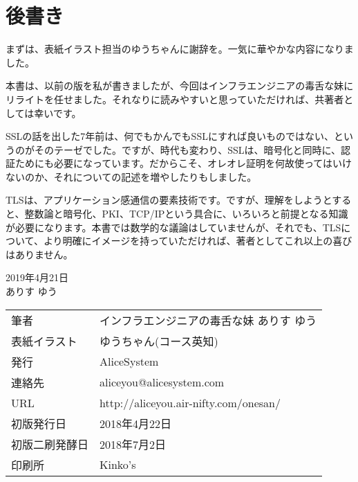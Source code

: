 \section*{後書き}

まずは、表紙イラスト担当のゆうちゃんに謝辞を。一気に華やかな内容になりました。

本書は、以前の版を私が書きましたが、今回はインフラエンジニアの毒舌な妹にリライトを任せました。それなりに読みやすいと思っていただければ、共著者としては幸いです。

SSLの話を出した7年前は、何でもかんでもSSLにすれば良いものではない、というのがそのテーゼでした。ですが、時代も変わり、SSLは、暗号化と同時に、認証ためにも必要になっています。だからこそ、オレオレ証明を何故使ってはいけないのか、それについての記述を増やしたりもしました。

TLSは、アプリケーション感通信の要素技術です。ですが、理解をしようとすると、整数論と暗号化、PKI、TCP/IPという具合に、いろいろと前提となる知識が必要になります。本書では数学的な議論はしていませんが、それでも、TLSについて、より明確にイメージを持っていただければ、著者としてこれ以上の喜びはありません。

\begin{flushright}
2019年4月21日 \\
ありす ゆう
\end{flushright}






\thispagestyle{empty}

\vspace*{\fill}
\begin{tabular}{ll} \toprule
筆者 & インフラエンジニアの毒舌な妹 ありす ゆう \\
表紙イラスト & ゆうちゃん(コース英知) \\
発行 & AliceSystem \\
連絡先 & aliceyou@alicesystem.com \\
URL & http://aliceyou.air-nifty.com/onesan/ \\
初版発行日 & 2018年4月22日 \\
初版二刷発酵日 & 2018年7月2日 \\
印刷所 & Kinko's \\ \bottomrule
\end{tabular}